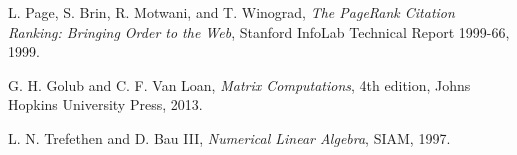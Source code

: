 \documentclass[11pt,a4paper]{article}
\begin{document}
\begin{thebibliography}{9}

L. Page, S. Brin, R. Motwani, and T. Winograd,
\textit{The PageRank Citation Ranking: Bringing Order to the Web},
Stanford InfoLab Technical Report 1999-66, 1999.

G. H. Golub and C. F. Van Loan,
\textit{Matrix Computations}, 4th edition,
Johns Hopkins University Press, 2013.

L. N. Trefethen and D. Bau III,
\textit{Numerical Linear Algebra},
SIAM, 1997.

\end{thebibliography}
\end{document}
